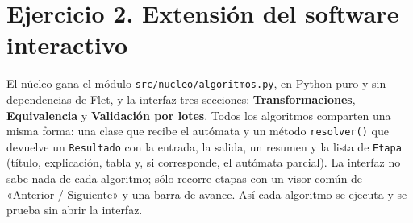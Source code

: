 \hypertarget{ejercicio-2.-extensiuxf3n-del-software-interactivo}{%
\section{Ejercicio 2. Extensión del software interactivo}\label{ejercicio-2.-extensiuxf3n-del-software-interactivo}}

El núcleo gana el módulo \texttt{src/nucleo/algoritmos.py}, en Python puro y sin dependencias de Flet, y la interfaz tres secciones: \textbf{Transformaciones}, \textbf{Equivalencia} y \textbf{Validación por lotes}. Todos los algoritmos comparten una misma forma: una clase que recibe el autómata y un método \texttt{resolver()} que devuelve un \texttt{Resultado} con la entrada, la salida, un resumen y la lista de \texttt{Etapa} (título, explicación, tabla y, si corresponde, el autómata parcial). La interfaz no sabe nada de cada algoritmo; sólo recorre etapas con un visor común de «Anterior / Siguiente» y una barra de avance. Así cada algoritmo se ejecuta y se prueba sin abrir la interfaz.

